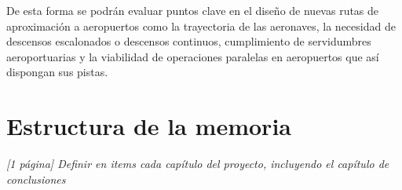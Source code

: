 De esta forma se podrán evaluar puntos clave en el diseño de nuevas rutas de aproximación a aeropuertos como la trayectoria de las aeronaves, la necesidad de descensos escalonados o descensos continuos, cumplimiento de servidumbres aeroportuarias y la viabilidad de operaciones paralelas en aeropuertos que así dispongan sus pistas.

\section{Estructura de la memoria}
\label{sec:estructura}

\textit{[1 página] Definir en items cada capítulo del proyecto, incluyendo el capítulo de conclusiones}